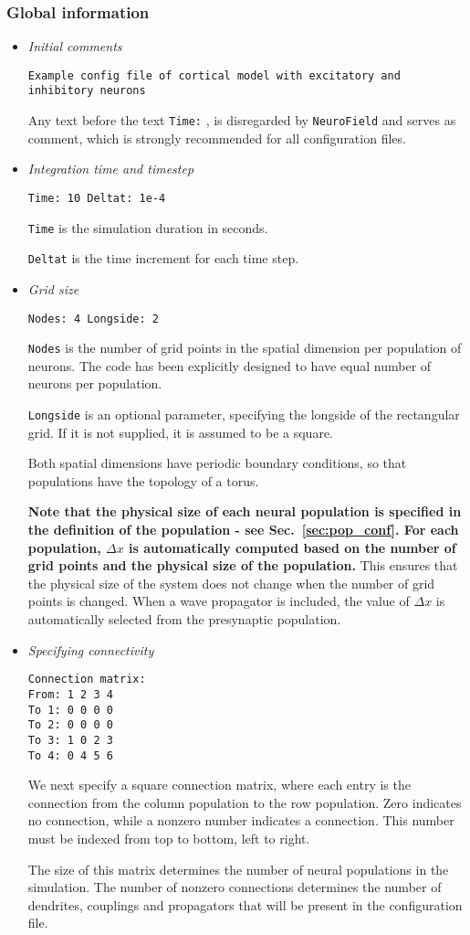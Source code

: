 \documentclass[12pt,a4paper]{article}
\newcommand{\type}[1]{{\small\small\tt #1} }
\newcommand{\NF}[0]{\type{NeuroField}}
\begin{document}
\clearpage


\subsubsection{Global information}
\label{sec:global}

\begin{itemize}
\item {\em Initial comments}
\begin{lstlisting}
Example config file of cortical model with excitatory and inhibitory neurons
\end{lstlisting}
Any text before the text \type{Time:}, is disregarded by \NF and serves as comment, which is strongly recommended for all configuration files.
\item  {\em Integration time and timestep}
\begin{lstlisting}
Time: 10 Deltat: 1e-4
\end{lstlisting}
\type{Time} is the simulation duration in seconds.

\type{Deltat} is the time increment for each time step.
\item  {\em Grid size}
\begin{lstlisting}
Nodes: 4 Longside: 2
\end{lstlisting}
\type{Nodes} is the number of grid points in the spatial dimension per population of neurons. The code has been explicitly designed to have equal number of neurons per population.

\type{Longside} is an optional parameter, specifying the longside of the rectangular grid. If it is not supplied, it is assumed to be a square.

Both spatial dimensions have periodic boundary conditions, so that populations have the topology of a torus.

{\bf Note that the physical size of each neural population is specified in the definition of the population - see Sec.~\ref{sec:pop_conf}. For each population, $\Delta x$ is automatically computed based on the number of grid points and the physical size of the population.} This ensures that the physical size of the system does not change when the number of grid points is changed. When a wave propagator is included, the value of $\Delta x$ is automatically selected from the presynaptic population.

\item {\em Specifying connectivity}
\begin{lstlisting}
Connection matrix:
From: 1 2 3 4
To 1: 0 0 0 0
To 2: 0 0 0 0
To 3: 1 0 2 3
To 4: 0 4 5 6
\end{lstlisting}
We next specify a square connection matrix, where each entry is the connection from the column population to the row population. Zero indicates no connection, while a nonzero number indicates a connection. This number must be indexed from top to bottom, left to right.

The size of this matrix determines the number of neural populations in the simulation. The number of nonzero connections determines the number of dendrites, couplings and propagators that will be present in the configuration file.
\end{itemize}
\end{document}
